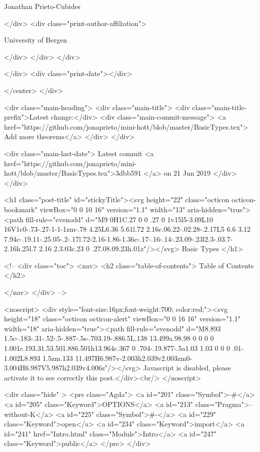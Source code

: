                   Jonathan Prieto-Cubides
                
              </div>
              <div class="print-author-affiliation">
                
                  University of Bergen
                
                </div>
            </div>
          </div>
          
          
        </div>
        <div class="print-date"></div>
        
        
    </center>
  </div>

  
  <div class="main-heading">
    <div class="main-title">
      <div class="main-title-prefix">Latest change:</div>
      <div class="main-commit-message">
            <a href="https://github.com/jonaprieto/mini-hott/blob/master/BasicTypes.tex">
              Add more theorems</a>
      </div>
    </div>

    <div class="main-last-date">
      Latest commit <a href="https://github.com/jonaprieto/mini-hott/blob/master/BasicTypes.tex">3dbb591 </a> on  21 Jun 2019
    </div>
  </div>
  
  <h1 class="post-title" id="stickyTitle"><svg height="22" class="octicon octicon-bookmark" viewBox="0 0 10 16" version="1.1" width="13" aria-hidden="true"><path fill-rule="evenodd" d="M9 0H1C.27 0 0 .27 0 1v15l5-3.09L10 16V1c0-.73-.27-1-1-1zm-.78 4.25L6.36 5.61l.72 2.16c.06.22-.02.28-.2.17L5 6.6 3.12 7.94c-.19.11-.25.05-.2-.17l.72-2.16-1.86-1.36c-.17-.16-.14-.23.09-.23l2.3-.03.7-2.16h.25l.7 2.16 2.3.03c.23 0 .27.08.09.23h.01z"/></svg> Basic Types
  </h1>

  <!-- 
  <div class="toc">
    <nav>
    <h2 class="table-of-contents"> Table of Contents </h2>
      

    </nav>
  </div>
   -->

  <noscript>
  <div style="font-size:16px;font-weight:700; color:red;"><svg height="18" class="octicon octicon-alert" viewBox="0 0 16 16" version="1.1" width="18" aria-hidden="true"><path fill-rule="evenodd" d="M8.893 1.5c-.183-.31-.52-.5-.887-.5s-.703.19-.886.5L.138 13.499a.98.98 0 0 0 0 1.001c.193.31.53.501.886.501h13.964c.367 0 .704-.19.877-.5a1.03 1.03 0 0 0 .01-1.002L8.893 1.5zm.133 11.497H6.987v-2.003h2.039v2.003zm0-3.004H6.987V5.987h2.039v4.006z"/></svg> Javascript is disabled, please activate it to see correctly this post.</div><br/>
  </noscript>

  <div class="hide" >
<pre class="Agda">
<a id="201" class="Symbol">{-#</a> <a id="205" class="Keyword">OPTIONS</a> <a id="213" class="Pragma">--without-K</a> <a id="225" class="Symbol">#-}</a>
<a id="229" class="Keyword">open</a> <a id="234" class="Keyword">import</a> <a id="241" href="Intro.html" class="Module">Intro</a> <a id="247" class="Keyword">public</a>
</pre>
</div>

